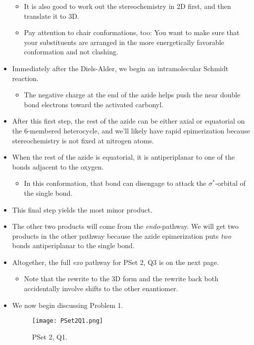 \documentclass[../notes.tex]{subfiles}
\begin{document}
\begin{itemize}
\begin{itemize}
        \item It is also good to work out the stereochemistry in 2D first, and then translate it to 3D.
        \item Pay attention to chair conformations, too: You want to make sure that your substituents are arranged in the more energetically favorable conformation and not clashing.
    \end{itemize}
    \item Immediately after the Diels-Alder, we begin an intramolecular Schmidt reaction.
    \begin{itemize}
        \item The negative charge at the end of the azide helps push the near double bond electrons toward the activated carbonyl.
    \end{itemize}
    \item After this first step, the rest of the azide can be either axial or equatorial on the 6-membered heterocycle, and we'll likely have rapid epimerization because stereochemistry is not fixed at nitrogen atoms.
    \item When the rest of the azide is equatorial, it is antiperiplanar to one of the  bonds adjacent to the oxygen.
    \begin{itemize}
        \item In this conformation, that bond can disengage to attack the $\sigma^*$-orbital of the  single bond.
    \end{itemize}
    \item This final step yields the most minor product.
    \item The other two products will come from the \emph{endo}-pathway. We will get two products in the other pathway because the azide epimerization puts \emph{two}  bonds antiperiplanar to the  single bond.
    \item Altogether, the full \emph{exo} pathway for PSet 2, Q3 is on the next page.
    \begin{itemize}
        \item Note that the rewrite to the 3D form and the rewrite back both accidentally involve shifts to the other enantiomer.
    \end{itemize}
    
    \item We now begin discussing Problem 1.
    \begin{figure}[h!]
        \centering
        \texttt{[image: PSet2Q1.png]}
        \caption{PSet 2, Q1.}

\end{figure}
\end{itemize}
\end{document}
